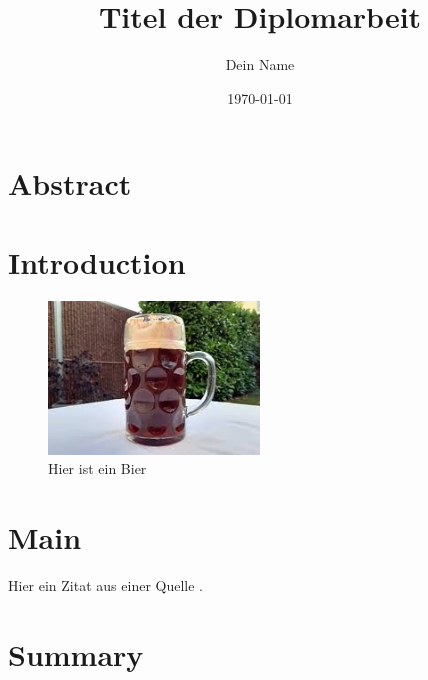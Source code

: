 \documentclass[a4paper,12pt]{report}
\begin{document}
\title{Titel der Diplomarbeit}
\author{Dein Name}
\date{\today}
\maketitle

\tableofcontents
\newpage

\chapter*{Abstract}
\lipsum[1]

\chapter{Introduction}
\lipsum[1]

\begin{figure}[h!]
    \centering
    \includegraphics[width=0.5\textwidth]{bier.jpg}
    \caption{Hier ist ein Bier}
    \label{fig:beispielbild}
\end{figure}

\chapter{Main}
\lipsum[1]

Hier ein Zitat aus einer Quelle \cite{author2023example}.

\chapter{Summary}
\lipsum[1]

\printbibliography

\listoffigures
\newpage
\end{document}
